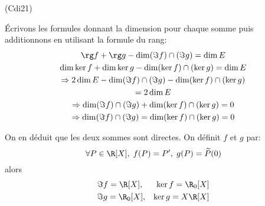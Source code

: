 \begin{tiny}(Cdi21)\end{tiny} \'Ecrivons les formules donnant la dimension pour chaque somme puis additionnons en utilisant la formule du rang:
\begin{multline*}
 \rg f + \rg g -\dim (\Im f)\cap (\Im g) = \dim E \\
 \dim \ker f + \dim \ker g -\dim (\ker f)\cap (\ker g) = \dim E \\
\Rightarrow 2\dim E -\dim(\Im f)\cap (\Im g) -\dim(\ker f)\cap (\ker g) \\
=2\dim E \\
\Rightarrow  \dim(\Im f)\cap (\Im g) +\dim (\ker f)\cap (\ker g) = 0 \\
\Rightarrow \dim (\Im f)\cap (\Im g) = \dim (\ker f)\cap (\ker g) = 0
\end{multline*}

On en déduit que les deux sommes sont directes.\newline
On définit $f$ et $g$ par:
\begin{displaymath}
  \forall P\in \R[X],\; f(P)= P', \; g(P) = \widetilde{P}(0)
\end{displaymath}
alors
\begin{align*}
  &\Im f = \R[X], &\ker f = \R_0[X] \\
  &\Im g = \R_0[X], &\ker g = X\R[X] 
\end{align*}

